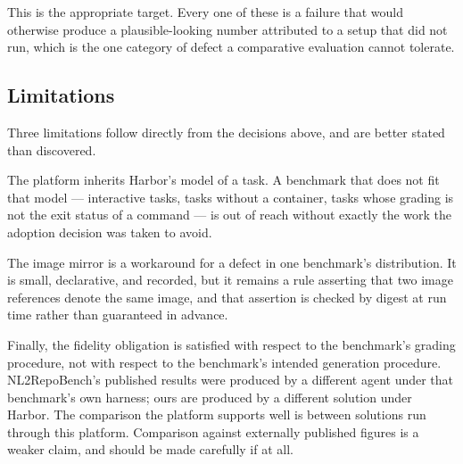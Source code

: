 This is the appropriate target. Every one of these is a failure that would
otherwise produce a plausible-looking number attributed to a setup that did not
run, which is the one category of defect a comparative evaluation cannot
tolerate.

\subsection{Limitations}

Three limitations follow directly from the decisions above, and are better
stated than discovered.

The platform inherits Harbor's model of a task. A benchmark that does not fit
that model --- interactive tasks, tasks without a container, tasks whose
grading is not the exit status of a command --- is out of reach without exactly
the work the adoption decision was taken to avoid.

The image mirror is a workaround for a defect in one benchmark's distribution.
It is small, declarative, and recorded, but it remains a rule asserting that
two image references denote the same image, and that assertion is checked by
digest at run time rather than guaranteed in advance.

Finally, the fidelity obligation is satisfied with respect to the benchmark's
grading procedure, not with respect to the benchmark's intended generation
procedure. NL2RepoBench's published results were produced by a different agent
under that benchmark's own harness; ours are produced by a different solution
under Harbor. The comparison the platform supports well is between solutions
run through this platform. Comparison against externally published figures is a
weaker claim, and should be made carefully if at all.


